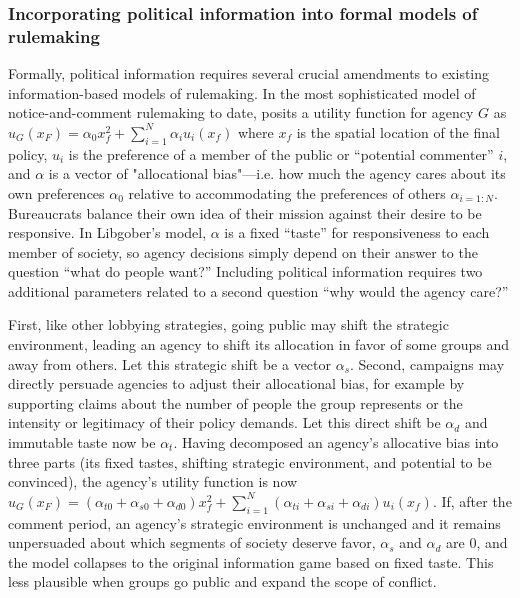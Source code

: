 \subsubsection*{Incorporating political information into formal models of rulemaking}

Formally, political information requires several crucial amendments to existing information-based models of rulemaking. In the most sophisticated model of notice-and-comment rulemaking to date, \citet{Libgober2018} posits a utility function for agency $G$ as $u_G(x_F) = \alpha_0 x_f^2 + \sum_{i=1}^N \alpha_i u_i (x_f)$ where $x_f$ is the spatial location of the final policy, $u_i$ is the preference of a member of the public or ``potential commenter'' $i$, and $\alpha$ is a vector of "allocational bias"---i.e. how much the agency cares about its own preferences $\alpha_0$ relative to accommodating the preferences of others $\alpha_{i=1:N}$. Bureaucrats balance their own idea of their mission against their desire to be responsive. In Libgober's model, $\alpha$ is a fixed ``taste'' for responsiveness to each member of society, so agency decisions simply depend on their answer to the question ``what do people want?'' Including political information requires two additional parameters related to a second question ``why would the agency care?''

First, like other lobbying strategies, going public may shift the strategic environment, leading an agency to shift its allocation in favor of some groups and away from others. Let this strategic shift be a vector $\alpha_s$. Second, campaigns may directly persuade agencies to adjust their allocational bias, for example by supporting claims about the number of people the group represents or the intensity or legitimacy of their policy demands. Let this direct shift be $\alpha_d$ and immutable taste now be $\alpha_t$. Having decomposed an agency's allocative bias into three parts (its fixed tastes, shifting strategic environment, and potential to be convinced), the agency's utility function is now  $u_G(x_F) =  (\alpha_{t0} + \alpha_{s0} + \alpha_{d0}) x_f^2 + \sum_{i=1}^N (\alpha_{ti} + \alpha_{si} + \alpha_{di}) u_i (x_f)$. If, after the comment period, an agency's strategic environment is unchanged and it remains unpersuaded about which segments of society deserve favor, $\alpha_s$ and $\alpha_d$ are 0, and the model collapses to the original information game based on fixed taste. This less plausible when groups go public and expand the scope of conflict. 

